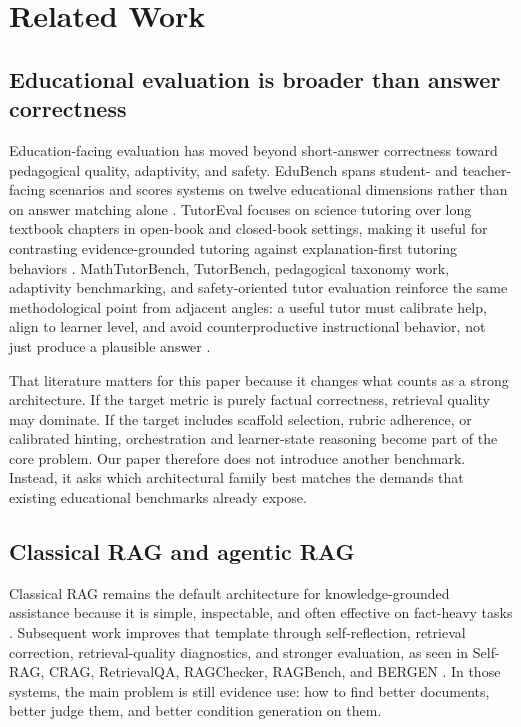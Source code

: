 \section{Related Work}

\subsection{Educational evaluation is broader than answer correctness}

Education-facing evaluation has moved beyond short-answer correctness toward pedagogical quality, adaptivity, and safety. EduBench spans student- and teacher-facing scenarios and scores systems on twelve educational dimensions rather than on answer matching alone \cite{xu2025edubench}. TutorEval focuses on science tutoring over long textbook chapters in open-book and closed-book settings, making it useful for contrasting evidence-grounded tutoring against explanation-first tutoring behaviors \cite{chevalier2024sciencetutors}. MathTutorBench, TutorBench, pedagogical taxonomy work, adaptivity benchmarking, and safety-oriented tutor evaluation reinforce the same methodological point from adjacent angles: a useful tutor must calibrate help, align to learner level, and avoid counterproductive instructional behavior, not just produce a plausible answer \cite{macina2025mathtutorbench,srinivasa2025tutorbench,maurya2025aitutoreval,borchers2025adaptivity,hazra2026safetutors}.

That literature matters for this paper because it changes what counts as a strong architecture. If the target metric is purely factual correctness, retrieval quality may dominate. If the target includes scaffold selection, rubric adherence, or calibrated hinting, orchestration and learner-state reasoning become part of the core problem. Our paper therefore does not introduce another benchmark. Instead, it asks which architectural family best matches the demands that existing educational benchmarks already expose.

\subsection{Classical RAG and agentic RAG}

Classical RAG remains the default architecture for knowledge-grounded assistance because it is simple, inspectable, and often effective on fact-heavy tasks \cite{lewis2020rag}. Subsequent work improves that template through self-reflection, retrieval correction, retrieval-quality diagnostics, and stronger evaluation, as seen in Self-RAG, CRAG, RetrievalQA, RAGChecker, RAGBench, and BERGEN \cite{asai2024selfrag,yan2024crag,zhang2024retrievalqa,ru2024ragchecker,friel2024ragbench,rau2024bergen,chen2023benchmarkingrag}. In those systems, the main problem is still evidence use: how to find better documents, better judge them, and better condition generation on them.

